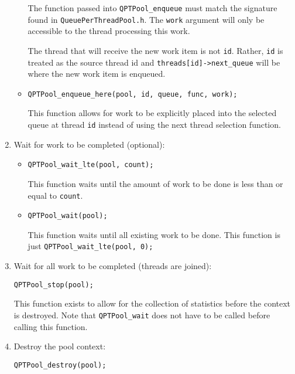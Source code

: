 \begin{enumerate}
\begin{itemize}
    The function passed into \texttt{QPTPool\_enqueue} must match the
    signature found in \texttt{QueuePerThreadPool.h}. The
    \texttt{work} argument will only be accessible to the thread
    processing this work.

    The thread that will receive the new work item is not \texttt{id}.
    Rather, \texttt{id} is treated as the source thread id and
    \texttt{threads[id]->next\_queue} will be where the new work item
    is enqueued.

    \item \texttt{QPTPool\_enqueue\_here(pool, id, queue, func, work);}

    This function allows for work to be explicitly placed into the
    selected queue at thread \texttt{id} instead of using the next
    thread selection function.
  \end{itemize}

\item Wait for work to be completed (optional):

  \begin{itemize}
    \item \texttt{QPTPool\_wait\_lte(pool, count);}

      This function waits until the amount of work to be done is less
      than or equal to \texttt{count}.

    \item \texttt{QPTPool\_wait(pool);}

      This function waits until all existing work to be done. This
      function is just \texttt{QPTPool\_wait\_lte(pool, 0);}
  \end{itemize}

\item Wait for all work to be completed (threads are joined):

  \texttt{QPTPool\_stop(pool);}

  This function exists to allow for the collection of statistics
  before the context is destroyed. Note that \texttt{QPTPool\_wait}
  does not have to be called before calling this function.

\item Destroy the pool context:

  \texttt{QPTPool\_destroy(pool);}
\end{enumerate}
